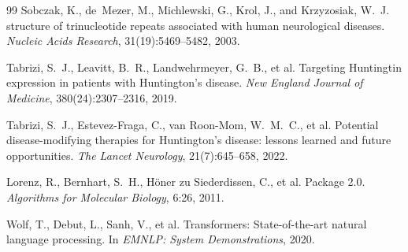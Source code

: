 \documentclass[11pt]{article}
\begin{document}
\begin{thebibliography}{99}
Sobczak, K., de~Mezer, M., Michlewski, G., Krol, J., and Krzyzosiak, W.~J.
 structure of trinucleotide repeats associated with human neurological diseases.
\newblock \emph{Nucleic Acids Research}, 31(19):5469--5482, 2003.

Tabrizi, S.~J., Leavitt, B.~R., Landwehrmeyer, G.~B., et al.
\newblock Targeting {Huntingtin} expression in patients with {Huntington's} disease.
\newblock \emph{New England Journal of Medicine}, 380(24):2307--2316, 2019.

Tabrizi, S.~J., Estevez-Fraga, C., van Roon-Mom, W.~M.~C., et al.
\newblock Potential disease-modifying therapies for {Huntington's} disease: lessons learned and future opportunities.
\newblock \emph{The Lancet Neurology}, 21(7):645--658, 2022.

Lorenz, R., Bernhart, S.~H., H\"oner zu Siederdissen, C., et al.
 Package 2.0.
\newblock \emph{Algorithms for Molecular Biology}, 6:26, 2011.

Wolf, T., Debut, L., Sanh, V., et al.
\newblock Transformers: State-of-the-art natural language processing.
\newblock In \emph{EMNLP: System Demonstrations}, 2020.

\end{thebibliography}
\end{document}
